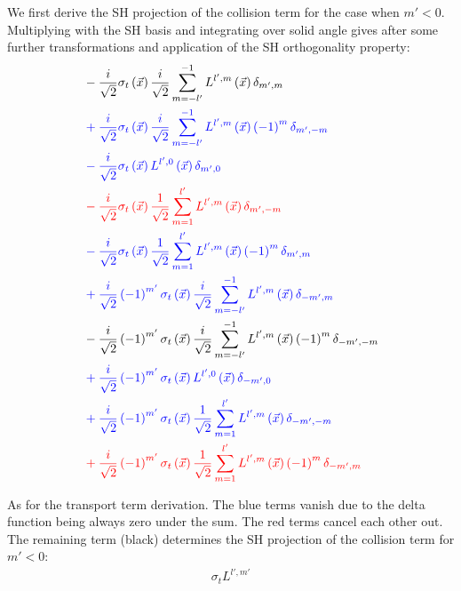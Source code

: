 \documentclass[10pt]{scrartcl}
\begin{document}
We first derive the SH projection of the collision term for the case when $m'<0$. Multiplying with the SH basis and integrating over solid angle gives after some further transformations and application of the SH orthogonality property:
\begin{align*}
&
\mathcolor{black}
{
-\frac{i}{\sqrt{2}}\sigma_t\left (\vec{x} \right )\frac{i}{\sqrt{2}}\sum_{m=-l'}^{-1}{L^{{l',m}}\left (\vec{x} \right )\delta_{m',m}}
}
\\&
\mathcolor{blue}
{
+\frac{i}{\sqrt{2}}\sigma_t\left (\vec{x} \right )\frac{i}{\sqrt{2}}\sum_{m=-l'}^{-1}{L^{{l',m}}\left (\vec{x} \right )\left({-1}\right)^{m}\delta_{m',-m}}
}
\\&
\mathcolor{blue}
{
-\frac{i}{\sqrt{2}}\sigma_t\left (\vec{x} \right )L^{{l',0}}\left (\vec{x} \right )\delta_{m',0}
}
\\&
\mathcolor{red}
{
-\frac{i}{\sqrt{2}}\sigma_t\left (\vec{x} \right )\frac{1}{\sqrt{2}}\sum_{m=1}^{l'}{L^{{l',m}}\left (\vec{x} \right )\delta_{m',-m}}
}
\\&
\mathcolor{blue}
{
-\frac{i}{\sqrt{2}}\sigma_t\left (\vec{x} \right )\frac{1}{\sqrt{2}}\sum_{m=1}^{l'}{L^{{l',m}}\left (\vec{x} \right )\left({-1}\right)^{m}\delta_{m',m}}
}
\\&
\mathcolor{blue}
{
+\frac{i}{\sqrt{2}}\left({-1}\right)^{m'}\sigma_t\left (\vec{x} \right )\frac{i}{\sqrt{2}}\sum_{m=-l'}^{-1}{L^{{l',m}}\left (\vec{x} \right )\delta_{-m',m}}
}
\\&
\mathcolor{black}
{
-\frac{i}{\sqrt{2}}\left({-1}\right)^{m'}\sigma_t\left (\vec{x} \right )\frac{i}{\sqrt{2}}\sum_{m=-l'}^{-1}{L^{{l',m}}\left (\vec{x} \right )\left({-1}\right)^{m}\delta_{-m',-m}}
}
\\&
\mathcolor{blue}
{
+\frac{i}{\sqrt{2}}\left({-1}\right)^{m'}\sigma_t\left (\vec{x} \right )L^{{l',0}}\left (\vec{x} \right )\delta_{-m',0}
}
\\&
\mathcolor{blue}
{
+\frac{i}{\sqrt{2}}\left({-1}\right)^{m'}\sigma_t\left (\vec{x} \right )\frac{1}{\sqrt{2}}\sum_{m=1}^{l'}{L^{{l',m}}\left (\vec{x} \right )\delta_{-m',-m}}
}
\\&
\mathcolor{red}
{
+\frac{i}{\sqrt{2}}\left({-1}\right)^{m'}\sigma_t\left (\vec{x} \right )\frac{1}{\sqrt{2}}\sum_{m=1}^{l'}{L^{{l',m}}\left (\vec{x} \right )\left({-1}\right)^{m}\delta_{-m',m}}
}
\end{align*}

As for the transport term derivation. The blue terms vanish due to the delta function being always zero under the sum. The red terms cancel each other out. The remaining term (black) determines the SH projection of the collision term for $m'<0$:
\begin{align}
\sigma_t L^{l',m'}
\end{align}
\end{document}
